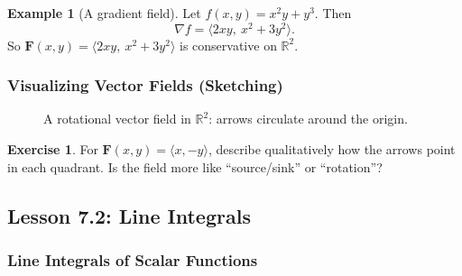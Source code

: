 \documentclass[12pt]{article}
\numberwithin{equation}{section}
\newcommand{\RR}{\mathbb{R}}
\newcommand{\vect}[1]{\boldsymbol{#1}}   %
\theoremstyle{plain}
\theoremstyle{definition}
\newtheorem{example}[theorem]{Example}
\newtheorem{exercise}[theorem]{Exercise}
\theoremstyle{remark}
\begin{document}
\begin{example}[A gradient field]
Let $f(x,y)=x^2y+y^3$. Then
\[
\nabla f=\langle 2xy,\ x^2+3y^2\rangle.
\]
So $\vect F(x,y)=\langle 2xy,\ x^2+3y^2\rangle$ is conservative on $\RR^2$.
\end{example}

\subsubsection{Visualizing Vector Fields (Sketching)}

\begin{figure}[H]
\centering
{}
\caption{A rotational vector field in $\RR^2$: arrows circulate around the origin.}
\label{fig:vectorfield-rot}
\end{figure}

\begin{exercise}
For $\vect F(x,y)=\langle x, -y\rangle$, describe qualitatively how the arrows point in each quadrant. Is the field more like “source/sink” or “rotation”?
\end{exercise}

\subsection{Lesson 7.2: Line Integrals}

\subsubsection{Line Integrals of Scalar Functions}
\end{document}

